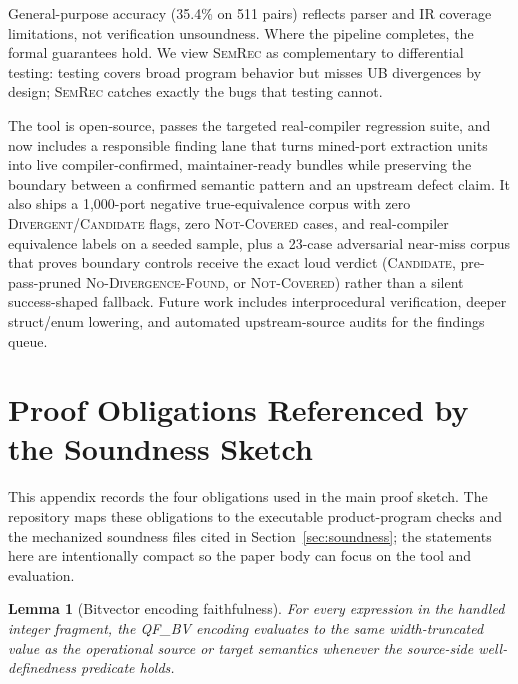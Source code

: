 \documentclass[10pt,a4paper]{article}
\newtheorem{lemma}[theorem]{Lemma}
\begin{document}
General-purpose accuracy (35.4\% on 511 pairs) reflects parser and IR
coverage limitations, not verification unsoundness.  Where the
pipeline completes, the formal guarantees hold.  We view
\textsc{SemRec} as complementary to differential testing: testing
covers broad program behavior but misses UB divergences by design;
\textsc{SemRec} catches exactly the bugs that testing cannot.

The tool is open-source, passes the targeted real-compiler regression suite, and
now includes a responsible finding lane that turns mined-port extraction units
into live compiler-confirmed, maintainer-ready bundles while preserving the
boundary between a confirmed semantic pattern and an upstream defect claim.  It
also ships a 1{,}000-port negative true-equivalence corpus with zero
\textsc{Divergent}/\textsc{Candidate} flags, zero \textsc{Not-Covered} cases, and
real-compiler equivalence labels on a seeded sample, plus a 23-case adversarial
near-miss corpus that proves boundary controls receive the exact loud verdict
(\textsc{Candidate}, pre-pass-pruned \textsc{No-Divergence-Found}, or
\textsc{Not-Covered}) rather than a silent success-shaped fallback.
Future work includes interprocedural verification, deeper struct/enum lowering,
and automated upstream-source audits for the findings queue.


\appendix
\section{Proof Obligations Referenced by the Soundness Sketch}\label{app:proofs}

This appendix records the four obligations used in the main proof sketch.  The
repository maps these obligations to the executable product-program checks and
the mechanized soundness files cited in Section~\ref{sec:soundness}; the
statements here are intentionally compact so the paper body can focus on the
tool and evaluation.

\begin{lemma}[Bitvector encoding faithfulness]\label{lem:bv-faithful}
For every expression in the handled integer fragment, the QF\_BV encoding
evaluates to the same width-truncated value as the operational source or target
semantics whenever the source-side well-definedness predicate holds.
\end{lemma}
\end{document}
